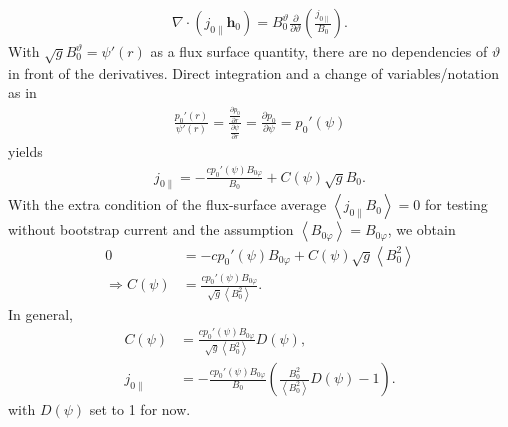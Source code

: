 \documentclass[a4paper, 10pt, english]{article}
\let\temp\vartheta
\let\vartheta\theta
\let\theta\temp
\let\temp\varphi
\let\varphi\phi
\let\phi\temp
\let\vec\symbf
\newcommand*\pd[2][]{\ensuremath{\frac{\partial #1}{\partial #2}}}
\begin{document}
\begin{gather}
  \nabla \cdot(j_{0 \parallel} \vec{h}_{0}) = B_{0}^{\theta} \pd{\theta} \left( \frac{j_{0 \parallel}}{B_{0}} \right).
\end{gather}
With $\sqrt{g} B_{0}^{\theta} = \psi'(r)$ as a flux surface quantity, there are no dependencies of $\theta$ in front of the derivatives. Direct integration and a change of variables/notation as in
\begin{gather}
  \frac{p_{0}'(r)}{\psi'(r)} = \frac{\pd[p_{0}]{r}}{\pd[\psi]{r}} = \pd[p_{0}]{\psi} = p_{0}'(\psi)
\end{gather}
yields
\begin{gather}
  j_{0 \parallel} = -\frac{c p_{0}'(\psi) B_{0 \phi}}{B_{0}} + C(\psi) \sqrt{g} B_{0}.
\end{gather}
With the extra condition of the flux-surface average $\left\langle j_{0 \parallel} B_{0} \right\rangle = 0$ for testing without bootstrap current and the assumption $\left\langle B_{0 \phi} \right\rangle = B_{0 \phi}$, we obtain
\begin{align}
  0 &= -c p_{0}'(\psi) B_{0 \phi} + C(\psi) \sqrt{g} \left\langle B_{0}^{2} \right\rangle \nonumber \\
  \Rightarrow C(\psi) &= \frac{c p_{0}'(\psi) B_{0 \phi}}{\sqrt{g} \left\langle B_{0}^{2} \right\rangle}.
\end{align}
In general, 
\begin{align}
  C(\psi) &= \frac{c p_{0}'(\psi) B_{0 \phi}}{\sqrt{g} \left\langle B_{0}^{2} \right\rangle} D(\psi), \\
  j_{0 \parallel} &= -\frac{c p_{0}'(\psi) B_{0 \phi}}{B_{0}} \left( \frac{B_{0}^{2}}{\left\langle B_{0}^{2} \right\rangle} D(\psi) - 1 \right).
\end{align}
with $D(\psi)$ set to 1 for now.
\end{document}
